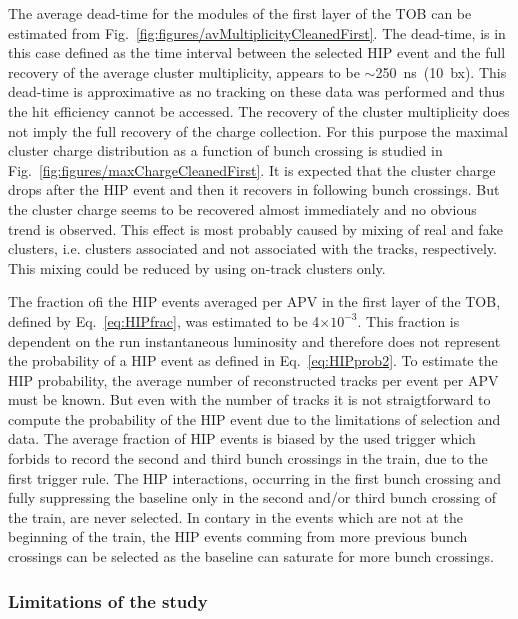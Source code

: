 The average dead-time for the modules of the first layer of the TOB can be estimated from Fig.~\ref{fig:figures/avMultiplicityCleanedFirst}. The dead-time, is in this case defined as the time interval between the selected HIP event and the full recovery of the average cluster multiplicity, appears to be $\sim$250~ns~(10~bx). This dead-time is approximative as no tracking on these data was performed and thus the hit efficiency cannot be accessed. The recovery of the cluster multiplicity does not imply the full recovery of the charge collection. For this purpose the maximal cluster charge distribution as a function of bunch crossing is studied in Fig.~\ref{fig:figures/maxChargeCleanedFirst}. It is expected that the cluster charge drops after the HIP event and then it recovers in following bunch crossings. But the cluster charge seems to be recovered almost immediately and no obvious trend is observed. This effect is most probably caused by mixing of real and fake clusters, i.e. clusters associated and not associated with the tracks, respectively. This mixing could be reduced by using on-track clusters only.

The fraction ofi the HIP events averaged per APV in the first layer of the TOB, defined by Eq.~\ref{eq:HIPfrac}, was estimated to be 4$\times 10^{-3}$. This fraction is dependent on the run instantaneous luminosity and therefore does not represent the probability of a HIP event as defined in Eq.~\ref{eq:HIPprob2}. To estimate the HIP probability, the average number of reconstructed tracks per event per APV must be known. But even with the number of tracks it is not straigtforward to compute the probability of the HIP event due to the limitations of selection and data. The average fraction of HIP events is biased by the used trigger which forbids to record the second and third bunch crossings in the train, due to the first trigger rule. The HIP interactions, occurring in the first bunch crossing and fully suppressing the baseline only in the second and/or third bunch crossing of the train, are never selected. In contary in the events which are not at the beginning of the train, the HIP events comming from more previous bunch crossings can be selected as the baseline can saturate for more bunch crossings.
 

\subsubsection{Limitations of the study~\label{sec:limitationsSelection}}

